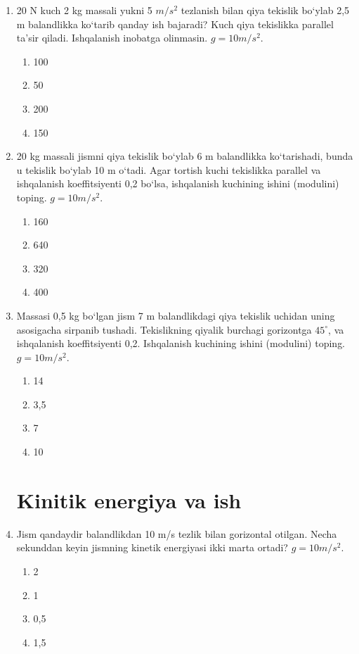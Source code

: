 \begin{enumerate}
\item 20 N kuch 2 kg massali yukni 5 $m/s^2$ tezlanish bilan qiya tekislik bo‘ylab 2,5 m balandlikka ko‘tarib qanday ish bajaradi? Kuch qiya tekislikka parallel ta’sir qiladi. Ishqalanish inobatga olinmasin. $g = 10 m/s^2$.
\begin{enumerate}[label=\Alph*)]
\item 100
\item 50
\item 200
\item 150
\end{enumerate}

\item 20 kg massali jismni qiya tekislik bo‘ylab 6 m balandlikka ko‘tarishadi, bunda u tekislik bo‘ylab 10 m o‘tadi. Agar tortish kuchi tekislikka parallel va ishqalanish koeffitsiyenti 0,2 bo‘lsa, ishqalanish kuchining ishini (modulini) toping. $g = 10 m/s^2$.
\begin{enumerate}[label=\Alph*)]
\item 160
\item 640
\item 320
\item 400
\end{enumerate}

\item Massasi 0,5 kg bo‘lgan jism 7 m balandlikdagi qiya tekislik uchidan uning asosigacha sirpanib tushadi. Tekislikning qiyalik burchagi gorizontga $45^\circ$, va ishqalanish koeffitsiyenti 0,2. Ishqalanish kuchining ishini (modulini) toping. $g = 10 m/s^2$.
\begin{enumerate}[label=\Alph*)]
\item 14
\item 3,5
\item 7
\item 10
\end{enumerate}




\section{Kinitik energiya va ish}

\item Jism qandaydir balandlikdan 10 m/s tezlik bilan gorizontal otilgan. Necha sekunddan keyin jismning kinetik energiyasi ikki marta ortadi? $g = 10 m/s^2$.
\begin{enumerate}[label=\Alph*)]
\item 2
\item 1
\item 0,5
\item 1,5
\end{enumerate}


\end{enumerate}
